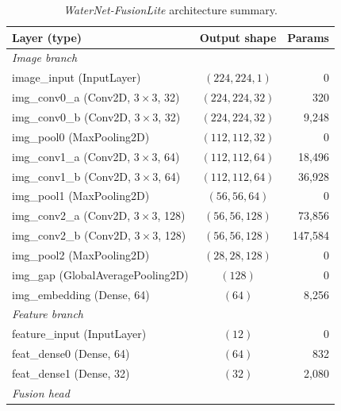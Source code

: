 \begin{table}[htbp]
    \caption{\textit{WaterNet-FusionLite} architecture summary.}
    \begin{center}
        \small
        \begin{tabular}{|l|c|r|}
        \hline
        \textbf{Layer (type)}
            & \textbf{Output shape}
            & \textbf{Params} \\
        \hline
        \multicolumn{3}{|l|}{\textit{Image branch}} \\
        \hline
        image\_input (InputLayer)
            & $(224, 224, 1)$ & 0 \\
        \hline
        img\_conv0\_a (Conv2D, $3\times3$, 32)
            & $(224, 224, 32)$ & 320 \\
        img\_conv0\_b (Conv2D, $3\times3$, 32)
            & $(224, 224, 32)$ & 9{,}248 \\
        img\_pool0 (MaxPooling2D)
            & $(112, 112, 32)$ & 0 \\
        \hline
        img\_conv1\_a (Conv2D, $3\times3$, 64)
            & $(112, 112, 64)$ & 18{,}496 \\
        img\_conv1\_b (Conv2D, $3\times3$, 64)
            & $(112, 112, 64)$ & 36{,}928 \\
        img\_pool1 (MaxPooling2D)
            & $(56, 56, 64)$ & 0 \\
        \hline
        img\_conv2\_a (Conv2D, $3\times3$, 128)
            & $(56, 56, 128)$ & 73{,}856 \\
        img\_conv2\_b (Conv2D, $3\times3$, 128)
            & $(56, 56, 128)$ & 147{,}584 \\
        img\_pool2 (MaxPooling2D)
            & $(28, 28, 128)$ & 0 \\
        \hline
        img\_gap (GlobalAveragePooling2D)
            & $(128)$ & 0 \\
        img\_embedding (Dense, 64)
            & $(64)$ & 8{,}256 \\
        \hline
        \multicolumn{3}{|l|}{\textit{Feature branch}} \\
        \hline
        feature\_input (InputLayer)
            & $(12)$ & 0 \\
        feat\_dense0 (Dense, 64)
            & $(64)$ & 832 \\
        feat\_dense1 (Dense, 32)
            & $(32)$ & 2{,}080 \\
        \hline
        \multicolumn{3}{|l|}{\textit{Fusion head}} \\

\end{tabular}
\end{center}
\end{table}
